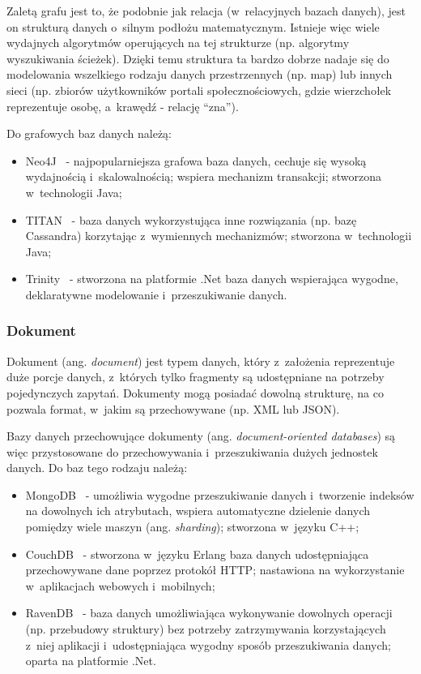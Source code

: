 Zaletą grafu jest to, że podobnie jak relacja (w~relacyjnych bazach danych), jest on strukturą danych o~silnym podłożu matematycznym.
Istnieje więc wiele wydajnych algorytmów operujących na tej strukturze (np. algorytmy wyszukiwania ścieżek).
Dzięki temu struktura ta bardzo dobrze nadaje się do modelowania wszelkiego rodzaju danych przestrzennych (np. map) lub innych sieci (np. zbiorów użytkowników portali społecznościowych, gdzie wierzchołek reprezentuje osobę, a~krawędź - relację ``zna'').

Do grafowych baz danych należą:

\begin{itemize}
 \item Neo4J~\cite{neo4j} - najpopularniejsza grafowa baza danych, cechuje się wysoką wydajnością i~skalowalnością; wspiera mechanizm transakcji; stworzona w~technologii Java;
 \item TITAN~\cite{titan} - baza danych wykorzystująca inne rozwiązania (np. bazę Cassandra) korzytając z~wymiennych mechanizmów; stworzona w~technologii Java;
 \item Trinity~\cite{trinity} - stworzona na platformie .Net baza danych wspierająca wygodne, deklaratywne modelowanie i~przeszukiwanie danych.
\end{itemize}

\subsubsection{Dokument}

Dokument (ang. \emph{document}) jest typem danych, który z~założenia reprezentuje duże porcje danych, z~których tylko fragmenty są udostępniane na potrzeby pojedynczych zapytań.
Dokumenty mogą posiadać dowolną strukturę, na co pozwala format, w~jakim są przechowywane (np. XML lub JSON).

Bazy danych przechowujące dokumenty (ang. \emph{document-oriented databases}) są więc przystosowane do przechowywania i~przeszukiwania dużych jednostek danych.
Do baz tego rodzaju należą:

\begin{itemize}
 \item MongoDB~\cite{mongo_db} - umożliwia wygodne przeszukiwanie danych i~tworzenie indeksów na dowolnych ich atrybutach, wspiera automatyczne dzielenie danych pomiędzy wiele maszyn (ang. \emph{sharding}); stworzona w~języku C++;
 \item CouchDB~\cite{couch_db} - stworzona w~języku Erlang baza danych udostępniająca przechowywane dane poprzez protokół HTTP; nastawiona na wykorzystanie w~aplikacjach webowych i~mobilnych;
 \item RavenDB~\cite{raven_db} - baza danych umożliwiająca wykonywanie dowolnych operacji (np. przebudowy struktury) bez potrzeby zatrzymywania korzystających z~niej aplikacji i~udostępniająca wygodny sposób przeszukiwania danych; oparta na platformie .Net.
\end{itemize}



